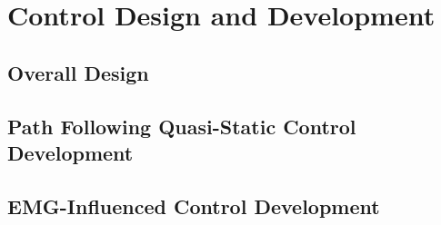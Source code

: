 \chapter{Control Design and Development}



\section{Overall Design}


\section{Path Following Quasi-Static Control Development }

\section{EMG-Influenced Control Development}
